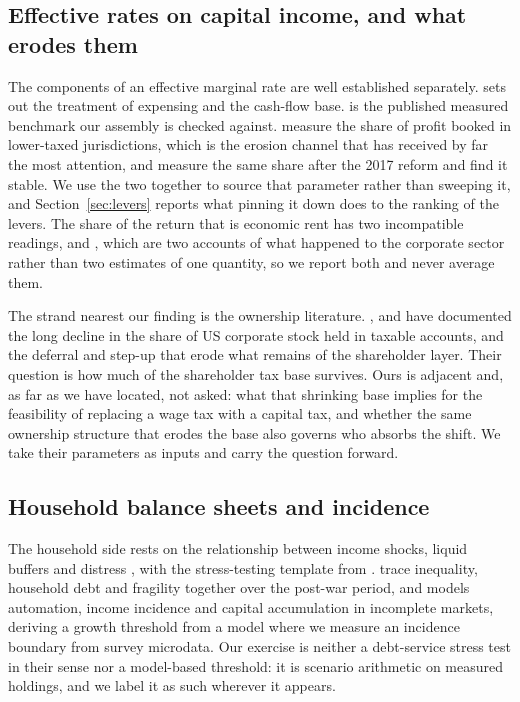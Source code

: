 \subsection{Effective rates on capital income, and what erodes them}

The components of an effective marginal rate are well established separately.
\citet{Auerbach2017} sets out the treatment of expensing and the cash-flow base.
\citet{CBO2014} is the published measured benchmark our assembly is checked against.
\citet{TorslovWierZucman2023} measure the share of profit booked in lower-taxed jurisdictions,
which is the erosion channel that has received by far the most attention, and
\citet{GarciaBernardoJanskyZucman2022} measure the same share after the 2017 reform and find it
stable. We use the two together to source that parameter rather than sweeping it, and
Section~\ref{sec:levers} reports what pinning it down does to the ranking of the levers. The
share of the return
that is economic rent has two incompatible readings, \citet{Barkai2020} and
\citet{KarabarbounisNeiman2014}, which are two accounts of what happened to the corporate sector
rather than two estimates of one quantity, so we report both and never average them.

The strand nearest our finding is the ownership literature.
\citet{RosenthalAustin2016}, \citet{RosenthalBurke2020} and \citet{RosenthalMucciolo2024} have
documented the long decline in the share of US corporate stock held in taxable accounts, and
\citet{Gravelle2022} the deferral and step-up that erode what remains of the shareholder layer.
Their question is how much of the shareholder tax base survives. Ours is adjacent and, as far as
we have located, not asked: what that shrinking base implies for the feasibility of replacing a
wage tax with a capital tax, and whether the same ownership structure that erodes the base also
governs who absorbs the shift. We take their parameters as inputs and carry the question forward.

\subsection{Household balance sheets and incidence}

The household side rests on the relationship between income shocks, liquid buffers and distress
\citep{MianRaoSufi2013,GanongNoel2020,BhuttaBrickerDettlingKelliherLaufer2019,MerikullRoom2020},
with the stress-testing template from \citet{AlbaceteFessler2010}.
\citet{BartscherKuhnSchularickSteins2020} trace inequality, household debt and fragility
together over the post-war period, and \citet{Bayraktar2026} models automation, income incidence
and capital accumulation in incomplete markets, deriving a growth threshold from a model where we
measure an incidence boundary from survey microdata. Our exercise is neither a debt-service
stress test in their sense nor a model-based threshold: it is scenario arithmetic on measured
holdings, and we label it as such wherever it appears.

